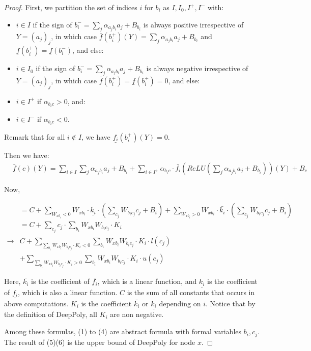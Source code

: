 \documentclass[]{article}
\theoremstyle{definition}
\begin{document}
\begin{proof}
First, we partition the set of indices $i$ for $b_i$ as $I,I_0,I^+,I^-$ with:
\begin{itemize}
	\item $i \in I$ if the sign of $b_i^-=\sum_{j} \alpha_{a_j b_i} a_j + B_{b_i}$ is always positive irrespective of $Y=(a_j)_j$, in which case $\bar{f}(b_i^+)(Y)=\sum_{j} \alpha_{a_j b_i} a_j + B_{b_i}$ and
	$\underline{f}(b_i^+)=\underline{f}(b_i^-)$, and else:
	\item $i \in I_0$ if the sign of $b_i^-=\sum_{j} \alpha_{a_j b_i} a_j + B_{b_i}$ is always negative irrespective of $Y=(a_j)_j$, in which case $\bar{f}(b_i^+)=\underline{f}(b_i^+)=0$,
	and else:
	\item $i \in I^+$ if $\alpha_{b_i c}>0$, and:
	\item $i \in I^-$ if $\alpha_{b_i c}<0$.
	\end{itemize}
	
Remark that for all $i \notin I$, we have $\underline{f_i}(b_i^+)(Y)=0$.
	

Then we have:
\begin{align*}
	&\bar{f}(c)(Y) = 
	\sum_{i \in I} \sum_{j} \alpha_{a_j b_i} a_j + B_{b_i}
	+ \sum_{i \in I^+} \alpha_{b_i c} \cdot \bar{f_i}(ReLU(\sum_{j} \alpha_{a_j b_i} a_j + B_{b_i}))(Y)+ B_c 
	\end{align*}
	
Now,


 \begin{align}
 &= C+\sum_{W_{xb_i}<0}W_{xb_i}\cdot\underline{k_i}\cdot(\sum_{c_j}W_{b_ic_j}c_j+B_i)+\sum_{W_{xb_i}>0}W_{xb_i}\cdot\bar{k_i}\cdot(\sum_{c_j}W_{b_ic_j}c_j+B_i)\\
 &= C+\sum_{c_j}c_j\cdot\sum_{b_i}W_{xb_i}W_{b_ic_j}\cdot K_i\\
 \rightarrow& C+\sum_{\sum_{b_i}W_{xb_i}W_{b_ic_j}\cdot K_i<0}\sum_{b_i}W_{xb_i}W_{b_ic_j}\cdot K_i\cdot l(c_j)\\
 &+\sum_{\sum_{b_i}W_{xb_i}W_{b_ic_j}\cdot K_i>0}\sum_{b_i}W_{xb_i}W_{b_ic_j}\cdot K_i\cdot u(c_j)
\end{align} 

Here, $\bar{k_i}$ is the coefficient of $\bar{f_i}$, which is a linear function, and $\underline{k_i}$ is the coefficient of $\underline{f_i}$, which is also a linear function. $C$ is the sum of all constants that occurs in above computations. $K_i$ is the coefficient $\bar{k_i}$ or $\underline{k_i}$ depending on $i$. Notice that by the definition of DeepPoly, all $K_i$ are non negative. 

Among these formulas, (1) to (4) are abstract formula with formal variables $b_i,c_j$. The result of (5)(6) is the upper bound of DeepPoly for node $x$. 


\end{proof}
\end{document}
